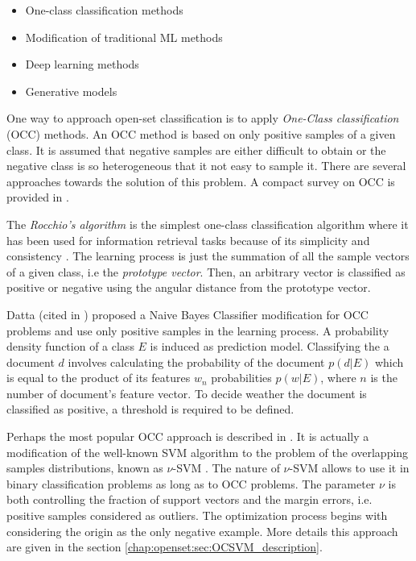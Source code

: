 \begin{itemize}
    \item One-class classification methods
    \item Modification of traditional ML methods
    \item Deep learning methods
    \item Generative models
\end{itemize}

One way to approach open-set classification is to apply \textit{One-Class classification} (OCC) methods. An OCC method is based on only positive samples of a given class. It is assumed that negative samples are either difficult to obtain or the negative class is so heterogeneous that it not easy to sample it. There are several approaches towards the solution of this problem. A compact survey on OCC is provided in \parencite{khan2010survey}. 

The \textit{Rocchio's algorithm} is the simplest one-class classification algorithm where it has been used for information retrieval tasks because of its simplicity and consistency \parencite{joachims1997probabilistic}. The learning process is just the summation of all the sample vectors of a given class, i.e the \textit{prototype vector}. Then, an arbitrary vector is classified as positive or negative using the angular distance from the prototype vector.

Datta (cited in \parencite{manevitz2002one}) proposed a Naive Bayes Classifier modification for OCC problems and use only positive samples in the learning process. A probability density function of a class $E$ is induced as prediction model. Classifying the a document $d$ involves calculating the probability of the document $p(d|E)$ which is equal to the product of its features $w_{n}$ probabilities $p(w|E)$, where $n$ is the number of document's feature vector. To decide weather the document is classified as positive, a threshold is required to be defined. 

Perhaps the most popular OCC approach is described in \parencite{scholkopf1999estimating}. It is actually a modification of the well-known SVM algorithm to the problem of the overlapping samples distributions, known as $\nu$-SVM \parencite{bishop2006}. The nature of $\nu$-SVM allows to use it in binary classification problems as long as to OCC problems. The parameter $\nu$ is both controlling the fraction of support vectors and the margin errors, i.e. positive samples considered as outliers. The optimization process begins with considering the origin as the only negative example. More details this approach are given in the section \ref{chap:openset:sec:OCSVM_description}.

